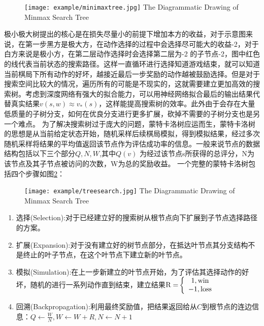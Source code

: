 \begin{figure}[htbp]
	\centering
	\texttt{[image: example/minimaxtree.jpg]}
	{The Diagrammatic Drawing of Minmax Search Tree}
	\label{minimaxsearchtree}
\end{figure}
极小极大树提出的核心是在损失尽量小的前提下增加本方的收益，对于示意图来说，在第一步黑方是极大方，在动作选择的过程中会选择尽可能大的收益-2，对于白方来说是极小方，在第二层动作选择时会选择第二层为-2 的子节点-2，图中红色的线代表当前状态的搜索路径。这样一直循环进行选择知道游戏结束，就可以知道当前棋局下所有动作的好坏，越接近最后一步奖励的动作越被鼓励选择。但是对于搜索空间比较大的情况，遍历所有的可能是不现实的，这就需要建立更加高效的搜索树。考虑到深度网络有强大的拟合能力，可以用神经网络拟合最后的输出结果代替真实结果$v(s,w) \approx {v_*}(s)$，这样能提高搜索树的效率。此外由于会存在大量低质量的子树分支，如何在优良分支进行更多扩展，砍掉不需要的子树分支也是另一个难点。
为了解决搜索树过于庞大的问题，蒙特卡洛树应运而生，蒙特卡洛树的思想是从当前给定状态开始，随机采样后续棋局模拟，得到模拟结果，经过多次随机采样将结果的平均值返回该节点作为评估成功率的信息。一般来说节点的数据结构包括以下三个部分${Q,N,W}$,其中$Q(v)$ 为经过该节点s所获得的总评分，N为该节点及其子节点被访问的次数，W为总的奖励收益。
一个完整的蒙特卡洛树包括四个步骤如图\ref{fig:treesearch}：

\begin{figure}[!htp]
	\centering
	\texttt{[image: example/treesearch.jpg]}
	{The Diagrammatic Drawing of Minmax Search Tree}
	\label{fig:treesearch}
\end{figure}
\begin{enumerate}
	\item 选择(Selection):对于已经建立好的搜索树从根节点向下扩展到子节点选择路径的方案。
	\item 扩展(Expansion):对于没有建立好的树节点部分，在抵达叶节点其分支结构不是终止的叶子节点，在这个叶节点下建立新的叶节点。
	\item 模拟(Simulation):在上一步新建立的叶节点开始，为了评估其选择动作的好坏，随机的进行一系列动作直到结束，建立结果${\rm{R = }}\left\{ {\begin{array}{*{20}{c}}
		{{\rm{1,win}}}\\
		{{\rm{ - 1,loss}}}
		\end{array}} \right.$
	\item 回溯(Backpropagation):利用最终奖励值，把结果返回给从$C$到根节点的连边信息：$Q \leftarrow \frac{W}{N},W \leftarrow W + R,N \leftarrow N + 1$
\end{enumerate}


